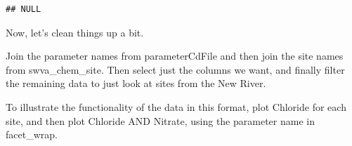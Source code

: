 \documentclass[
]{book}
\newenvironment{Shaded}{\begin{snugshade}}{\end{snugshade}}
\newcommand{\AttributeTok}[1]{\textcolor[rgb]{0.77,0.63,0.00}{#1}}
\newcommand{\CommentTok}[1]{\textcolor[rgb]{0.56,0.35,0.01}{\textit{#1}}}
\newcommand{\FunctionTok}[1]{\textcolor[rgb]{0.00,0.00,0.00}{#1}}
\newcommand{\NormalTok}[1]{#1}
\newcommand{\OtherTok}[1]{\textcolor[rgb]{0.56,0.35,0.01}{#1}}
\newcommand{\SpecialCharTok}[1]{\textcolor[rgb]{0.00,0.00,0.00}{#1}}
\newcommand{\StringTok}[1]{\textcolor[rgb]{0.31,0.60,0.02}{#1}}
\begin{document}
\begin{Shaded}
\end{Shaded}

\begin{verbatim}
## NULL
\end{verbatim}

Now, let's clean things up a bit.

Join the parameter names from parameterCdFile and then join the site names from swva\_chem\_site. Then select just the columns we want, and finally filter the remaining data to just look at sites from the New River.

To illustrate the functionality of the data in this format, plot Chloride for each site, and then plot Chloride AND Nitrate, using the parameter name in facet\_wrap.
\end{document}
